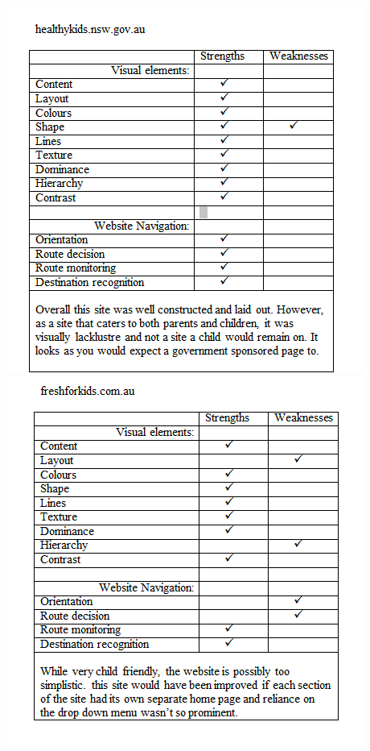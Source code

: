 \documentclass[letterpaper,12pt]{article}
\begin{document}
\includegraphics{assets/jpg/tab1}
\includegraphics{assets/jpg/tab2}
\end{document}
